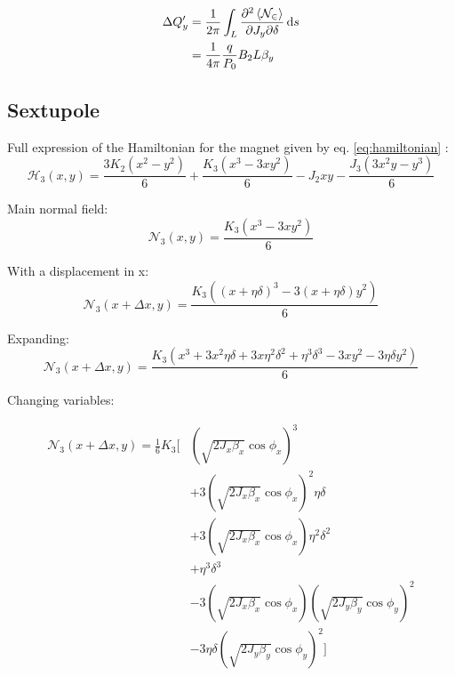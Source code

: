 \documentclass[openright,twoside,headsepline,bibliography=totoc]{scrbook}
\begin{document}
\begin{equation}\begin{aligned}
\Delta Q'_y &= \frac{1}{2\pi} \int_L \frac{\partial^2 \left< \mathcal{N_2} \right>}{\partial J_y \partial \delta} \mathop{}\!\mathrm{d} s \\
  & = \frac{1}{4 \pi} \frac{q}{P_0} B_2 L \beta_y
\end{aligned}\end{equation}

\newpage

\hypertarget{sextupole-2}{%
\subsection{Sextupole}\label{sextupole-2}}

Full expression of the Hamiltonian for the magnet given by eq.
\ref{eq:hamiltonian} :
\begin{equation}\mathcal{H_3}(x, y) = \frac{3 K_{2} \left(x^{2} - y^{2}\right)}{6} + \frac{K_{3} \left(x^{3} - 3 x y^{2}\right)}{6} - J_{2} x y - \frac{J_{3} \left(3 x^{2}y - y^{3}\right)}{6}\end{equation}

Main normal field:
\begin{equation}\mathcal{N_3}(x, y) = \frac{K_{3} \left(x^{3} - 3 xy^{2}\right)}{6}\end{equation}

With a displacement in x:
\begin{equation}\mathcal{N_3}(x + \Delta x, y) = \frac{K_{3} \left((x + \eta \delta)^{3} - 3 (x + \eta \delta)y^{2}\right)}{6}\end{equation}

Expanding:
\begin{equation}\mathcal{N_3}(x + \Delta x, y) = \frac{K_{3} \left(x^3 + 3 x^2 \eta \delta + 3 x \eta^2 \delta^2 + \eta^3 \delta^3 - 3xy^2 - 3 \eta \delta y^2 \right)}{6}\end{equation}

Changing variables:

\begin{equation}\begin{aligned}
  \mathcal{N_3}(x + \Delta x, y) = \frac{1}{6} K_3 \biggl[&
       \left(\sqrt{2 J_x \beta_x} \cos \phi_x\right)^3 \\
  &    + 3 \left(\sqrt{2 J_x \beta_x} \cos \phi_x\right)^2 \eta \delta \\
  &    + 3 \left(\sqrt{2 J_x \beta_x} \cos \phi_x\right) \eta^2 \delta^2 \\
  &    + \eta^3 \delta^3 \\
  &    - 3 \left(\sqrt{2 J_x \beta_x} \cos \phi_x \right) \left(\sqrt{2 J_y \beta_y} \cos \phi_y \right)^2 \\
  &    - 3 \eta \delta (\sqrt{2 J_y \beta_y} \cos \phi_y)^2 \biggl]
\end{aligned}\end{equation}
\end{document}
